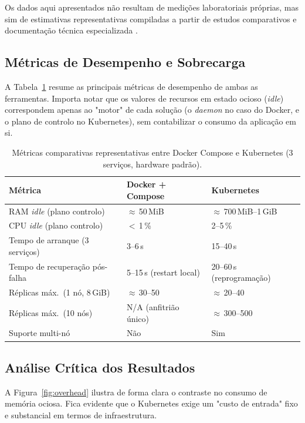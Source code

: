 \documentclass[conference]{IEEEtran}
\begin{document}
Os dados aqui apresentados não resultam de medições laboratoriais próprias, mas sim de estimativas representativas compiladas a partir de estudos comparativos e documentação técnica especializada \cite{felter2015,pahl2019,kratzke2017,dockerdocs,k8sdocs}.


\subsection{Métricas de Desempenho e Sobrecarga}

A Tabela~\ref{tab:bench} resume as principais métricas de desempenho de ambas as ferramentas. Importa notar que os valores de recursos em estado ocioso (\textit{idle}) correspondem apenas ao "motor"  de cada solução (o \textit{daemon} no caso do Docker, e o plano de controlo no Kubernetes), sem contabilizar o consumo da aplicação em si.

\begin{table}[t]
\caption{Métricas comparativas representativas entre Docker Compose e Kubernetes (3 serviços, hardware padrão).}
\label{tab:bench}
\centering
\renewcommand{\arraystretch}{1.2}
\footnotesize
\begin{tabular}{@{}p{2.3cm}p{2.2cm}p{2.2cm}@{}}
\toprule
\textbf{Métrica} & \textbf{Docker + Compose} & \textbf{Kubernetes} \\
\midrule
RAM \textit{idle} (plano controlo) & $\approx$\,50\,MiB & $\approx$\,700\,MiB--1\,GiB \\
CPU \textit{idle} (plano controlo) & $<$\,1\,\% & 2--5\,\% \\
Tempo de arranque (3 serviços) & 3--6\,s & 15--40\,s \\
Tempo de recuperação pós-falha & 5--15\,s (restart local) & 20--60\,s (reprogramação) \\
Réplicas máx.\ (1 nó, 8\,GiB) & $\approx$\,30--50 & $\approx$\,20--40 \\
Réplicas máx.\ (10 nós) & N/A (anfitrião único) & $\approx$\,300--500 \\
Suporte multi-nó & Não & Sim \\
\bottomrule
\end{tabular}
\end{table}

\subsection{Análise Crítica dos Resultados}

A Figura~\ref{fig:overhead} ilustra de forma clara o contraste no consumo de memória ociosa. Fica evidente que o Kubernetes exige um "custo de entrada" fixo e substancial em termos de infraestrutura.
\end{document}
